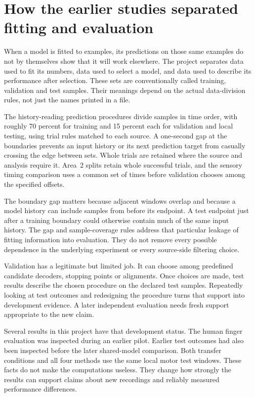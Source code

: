 \section{How the earlier studies separated fitting and evaluation}

When a model is fitted to examples, its predictions on those same examples do not by themselves show that it will work elsewhere. The project separates data used to fit its numbers, data used to select a model, and data used to describe its performance after selection. These sets are conventionally called training, validation and test samples. Their meanings depend on the actual data-division rules, not just the names printed in a file.

The history-reading prediction procedures divide samples in time order, with roughly 70 percent for training and 15 percent each for validation and local testing, using trial rules matched to each source. A one-second gap at the boundaries prevents an input history or its next prediction target from casually crossing the edge between sets. Whole trials are retained where the source and analysis require it. Area~2 splits retain whole successful trials, and the sensory timing comparison uses a common set of times before validation chooses among the specified offsets.

The boundary gap matters because adjacent windows overlap and because a model history can include samples from before its endpoint. A test endpoint just after a training boundary could otherwise contain much of the same input history. The gap and sample-coverage rules address that particular leakage of fitting information into evaluation. They do not remove every possible dependence in the underlying experiment or every source-side filtering choice.

Validation has a legitimate but limited job. It can choose among predefined candidate decoders, stopping points or alignments. Once choices are made, test results describe the chosen procedure on the declared test samples. Repeatedly looking at test outcomes and redesigning the procedure turns that support into development evidence. A later independent evaluation needs fresh support appropriate to the new claim.

Several results in this project have that development status. The human finger evaluation was inspected during an earlier pilot. Earlier test outcomes had also been inspected before the later shared-model comparison. Both transfer conditions and all four methods use the same local motor test windows. These facts do not make the computations useless. They change how strongly the results can support claims about new recordings and reliably measured performance differences.


